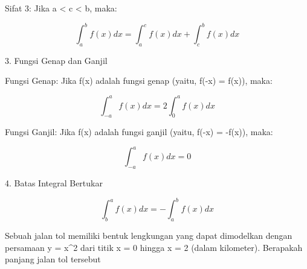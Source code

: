 \documentclass[a4paper,10pt]{article}
\begin{document}
\begin{eulernotebook}
\begin{eulercomment}
\begin{eulercomment}
\begin{eulercomment}
\begin{eulercomment}
\begin{eulercomment}
\begin{eulercomment}
\begin{eulercomment}
\begin{eulercomment}
\begin{eulercomment}
\begin{eulercomment}
\begin{eulercomment}
\begin{eulercomment}
\begin{eulercomment}
\begin{eulercomment}
\begin{eulercomment}
\begin{eulercomment}
\begin{eulercomment}
\begin{eulercomment}
\begin{eulercomment}
\begin{eulercomment}
\begin{eulercomment}
\begin{eulercomment}
\begin{eulercomment}
\begin{eulercomment}
\begin{eulercomment}
Sifat 3: Jika a \textless{} c \textless{} b, maka:\\
\end{eulercomment}
\begin{eulerformula}
\[
\int_a^b f(x) dx = \int_a^c f(x) dx + \int_c^b f(x) dx
\]
\end{eulerformula}
\begin{eulercomment}
3. Fungsi Genap dan Ganjil

Fungsi Genap: Jika f(x) adalah fungsi genap (yaitu, f(-x) = f(x)),
maka:\\
\end{eulercomment}
\begin{eulerformula}
\[
\int_{-a}^a f(x) dx = 2 \int_0^a f(x) dx
\]
\end{eulerformula}
\begin{eulercomment}
Fungsi Ganjil: Jika f(x) adalah fungsi ganjil (yaitu, f(-x) = -f(x)),
maka:\\
\end{eulercomment}
\begin{eulerformula}
\[
\int_{-a}^a f(x) dx = 0
\]
\end{eulerformula}
\begin{eulercomment}
4. Batas Integral Bertukar\\
\end{eulercomment}
\begin{eulerformula}
\[
\int_b^a f(x) dx = -\int_a^b f(x) dx
\]
\end{eulerformula}
\begin{eulercomment}
\end{eulercomment}
\begin{eulercomment}
Sebuah jalan tol memiliki bentuk lengkungan yang dapat dimodelkan
dengan persamaan y = x\textasciicircum{}2 dari titik x = 0 hingga x = 2 (dalam
kilometer). Berapakah panjang jalan tol tersebut


\end{eulercomment}
\end{eulercomment}
\end{eulercomment}
\end{eulercomment}
\end{eulercomment}
\end{eulercomment}
\end{eulercomment}
\end{eulercomment}
\end{eulercomment}
\end{eulercomment}
\end{eulercomment}
\end{eulercomment}
\end{eulercomment}
\end{eulercomment}
\end{eulercomment}
\end{eulercomment}
\end{eulercomment}
\end{eulercomment}
\end{eulercomment}
\end{eulercomment}
\end{eulercomment}
\end{eulercomment}
\end{eulercomment}
\end{eulercomment}
\end{eulercomment}
\end{eulernotebook}
\end{document}
